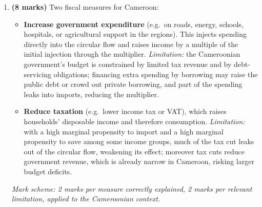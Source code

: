 \documentclass[11pt]{article}
\begin{document}
\begin{corrige}
\begin{enumerate}
\item \textbf{(8 marks)} Two fiscal measures for Cameroon:
\begin{itemize}
\item \textbf{Increase government expenditure} (e.g.\ on roads, energy, schools, hospitals, or agricultural support in the regions). This injects spending directly into the circular flow and raises income by a multiple of the initial injection through the multiplier. \emph{Limitation:} the Cameroonian government's budget is constrained by limited tax revenue and by debt-servicing obligations; financing extra spending by borrowing may raise the public debt or crowd out private borrowing, and part of the spending leaks into imports, reducing the multiplier.
\item \textbf{Reduce taxation} (e.g.\ lower income tax or VAT), which raises households' disposable income and therefore consumption. \emph{Limitation:} with a high marginal propensity to import and a high marginal propensity to save among some income groups, much of the tax cut leaks out of the circular flow, weakening its effect; moreover tax cuts reduce government revenue, which is already narrow in Cameroon, risking larger budget deficits.
\end{itemize}
\emph{Mark scheme: 2 marks per measure correctly explained, 2 marks per relevant limitation, applied to the Cameroonian context.}
\end{enumerate}
\end{corrige}
\end{document}
